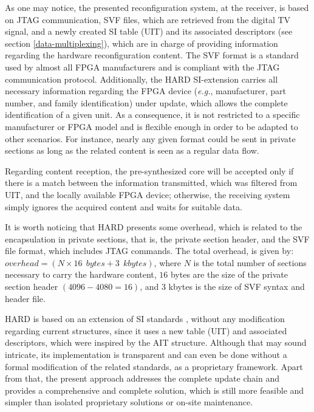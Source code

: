 As one may notice, the presented reconfiguration system, at the receiver, is based on JTAG communication, SVF files, which are retrieved from the digital TV signal, and a newly created SI table (UIT) and its associated descriptors (see section \ref{data-multiplexing}), which are in charge of providing information regarding the hardware reconfiguration content. The SVF format is a standard used by almost all FPGA manufacturers and is compliant with the JTAG communication protocol. Additionally, the HARD SI-extension carries all necessary information regarding the FPGA device ({\it e.g.}, manufacturer, part number, and family identification) under update, which allows the complete identification of a given unit. As a consequence, it is not restricted to a specific manufacturer or FPGA model and is flexible enough in order to be adapted to other scenarios. For instance, nearly any given format could be sent in private sections as long as the related content is seen as a regular data flow.

Regarding content reception, the pre-synthesized core will be accepted only if there is a match between the information transmitted, which was filtered from UIT, and the locally available FPGA device; otherwise, the receiving system simply ignores the acquired content and waits for suitable data.

It is worth noticing that HARD presents some overhead, which is related to the encapsulation in private sections, that is, the private section header, and the SVF file format, which includes JTAG commands. The total overhead, is given by: $overhead = \left(N \times 16 \: \: bytes + 3 \: \: kbytes\right)$, where $N$ is the total number of sections necessary to carry the hardware content, $16$ bytes are the size of the private section header $\left(4096-4080 = 16\right)$, and $3$ kbytes is the size of SVF syntax and header file. 


HARD is based on an extension of SI standards \cite{dvbsi,isdbtsi}, without any modification regarding current structures, since it uses a new table (UIT) and associated descriptors, which were inspired by the AIT structure. Although that may sound intricate, its implementation is transparent and can even be done without a formal modification of the related standards, as a proprietary framework. Apart from that, the present approach addresses the complete update chain and provides a comprehensive and complete solution, which is still more feasible and simpler than isolated proprietary solutions or on-site maintenance.

